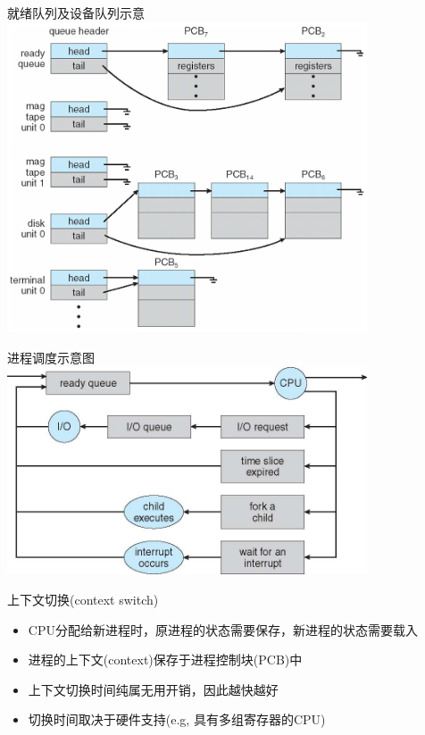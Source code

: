 \documentclass[xcolor=svgnames]{beamer}
\begin{document}
\begin{CJK*}{UTF8}{gbsn}
\begin{frame}{就绪队列及设备队列示意}
\includegraphics[width=0.8\textwidth]{queues.png}
\end{frame}

\begin{frame}{进程调度示意图}
\includegraphics[width=0.8\textwidth]{scheduling.jpg}
\end{frame}


\begin{frame}{上下文切换(context switch)}
\begin{itemize}
\item CPU分配给新进程时，原进程的状态需要保存，新进程的状态需要载入
\item 进程的上下文(context)保存于进程控制块(PCB)中
\item 上下文切换时间纯属无用开销，因此越快越好
\item 切换时间取决于硬件支持(e.g, 具有多组寄存器的CPU)
\end{itemize}
\end{frame}



\end{CJK*}
\end{document}
